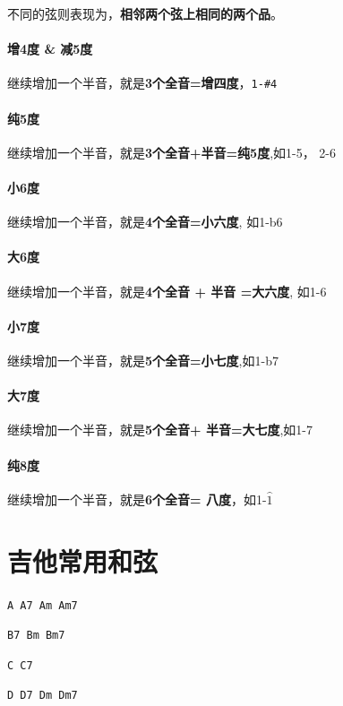 \documentclass[UTF8,a4paper,12pt]{ctexbook}
\begin{document}
				不同的弦则表现为，\textbf{相邻两个弦上相同的两个品}。
				
			\paragraph{增4度  \&  减5度}				
				继续增加一个半音，就是\textbf{3个全音=增四度}，\verb|1-#4|
				
			\paragraph{纯5度}				
				继续增加一个半音，就是\textbf{3个全音+半音=纯5度},如1-5， 2-6
				
			\paragraph{小6度}
				继续增加一个半音，就是\textbf{4个全音=小六度}, 如1-b6
				
			\paragraph{大6度}	
				继续增加一个半音，就是\textbf{4个全音 + 半音 =大六度},  如1-6
				
			\paragraph{小7度}
				继续增加一个半音，就是\textbf{5个全音=小七度},如1-b7
				
			\paragraph{大7度}	
				继续增加一个半音，就是\textbf{5个全音+ 半音=大七度},如1-7
				
			\paragraph{纯8度}	
				继续增加一个半音，就是\textbf{6个全音= 八度}，如1-$\hat{1}$
	
	\section{吉他常用和弦}
	
		 \verb|A A7 Am Am7|
		
		 \verb|B7 Bm Bm7| 
		 
		 \verb|C C7| 
		 
		 \verb|D D7 Dm Dm7 |
		 
\end{document}
